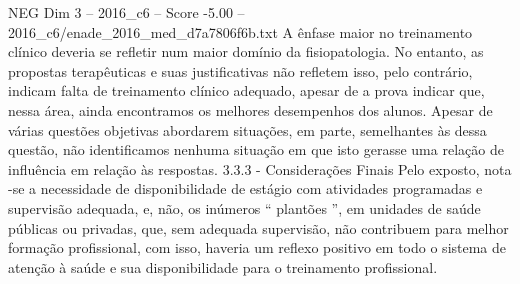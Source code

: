 \begin{textsample}{NEG Dim 3 – 2016\_c6 – Score -5.00 – 2016\_c6/enade\_2016\_med\_d7a7806f6b.txt}
A ênfase maior no treinamento clínico deveria se refletir num maior domínio da fisiopatologia.
No entanto, as propostas terapêuticas e suas justificativas não refletem isso, pelo contrário, indicam falta de treinamento clínico adequado, apesar de a prova indicar que, nessa área, ainda encontramos os melhores desempenhos dos alunos.
Apesar de várias questões objetivas abordarem situações, em parte, semelhantes às dessa questão, não identificamos nenhuma situação em que isto gerasse uma relação de influência em relação às respostas. 3.3.3 - Considerações Finais Pelo exposto, nota -se a necessidade de disponibilidade de estágio com atividades programadas e supervisão adequada, e, não, os inúmeros “ plantões ”, em unidades de saúde públicas ou privadas, que, sem adequada supervisão, não contribuem para melhor formação profissional, com isso, haveria um reflexo positivo em todo o sistema de atenção à saúde e sua disponibilidade para o treinamento profissional.

\end{textsample}
